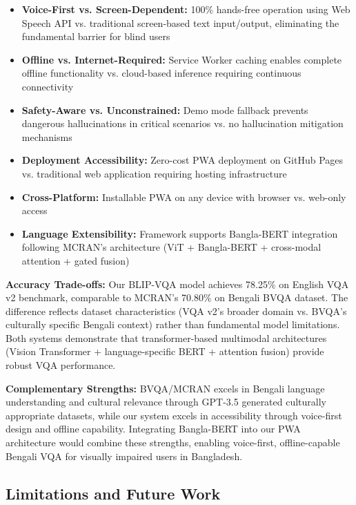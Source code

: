 \documentclass[conference]{IEEEtran}
\begin{document}
\begin{itemize}
    \item \textbf{Voice-First vs. Screen-Dependent:} 100\% hands-free operation using Web Speech API vs. traditional screen-based text input/output, eliminating the fundamental barrier for blind users
    \item \textbf{Offline vs. Internet-Required:} Service Worker caching enables complete offline functionality vs. cloud-based inference requiring continuous connectivity
    \item \textbf{Safety-Aware vs. Unconstrained:} Demo mode fallback prevents dangerous hallucinations in critical scenarios vs. no hallucination mitigation mechanisms
    \item \textbf{Deployment Accessibility:} Zero-cost PWA deployment on GitHub Pages vs. traditional web application requiring hosting infrastructure
    \item \textbf{Cross-Platform:} Installable PWA on any device with browser vs. web-only access
    \item \textbf{Language Extensibility:} Framework supports Bangla-BERT integration following MCRAN's architecture (ViT + Bangla-BERT + cross-modal attention + gated fusion)
\end{itemize}

\textbf{Accuracy Trade-offs:} Our BLIP-VQA model achieves 78.25\% on English VQA v2 benchmark, comparable to MCRAN's 70.80\% on Bengali BVQA dataset. The difference reflects dataset characteristics (VQA v2's broader domain vs. BVQA's culturally specific Bengali context) rather than fundamental model limitations. Both systems demonstrate that transformer-based multimodal architectures (Vision Transformer + language-specific BERT + attention fusion) provide robust VQA performance.

\textbf{Complementary Strengths:} BVQA/MCRAN excels in Bengali language understanding and cultural relevance through GPT-3.5 generated culturally appropriate datasets, while our system excels in accessibility through voice-first design and offline capability. Integrating Bangla-BERT into our PWA architecture would combine these strengths, enabling voice-first, offline-capable Bengali VQA for visually impaired users in Bangladesh.

\subsection{Limitations and Future Work}
\end{document}
